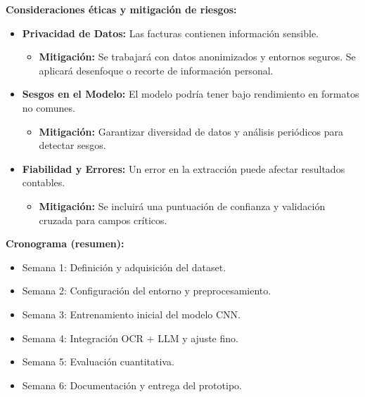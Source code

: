 \documentclass[11pt,letterpaper]{article}
\begin{document}
	\textbf{Consideraciones éticas y mitigación de riesgos:}
	\begin{itemize}
		\item \textbf{Privacidad de Datos:} Las facturas contienen información sensible.
		\begin{itemize}
			\item \textbf{Mitigación:} Se trabajará con datos anonimizados y entornos seguros. Se aplicará desenfoque o recorte de información personal.
		\end{itemize}
		\item \textbf{Sesgos en el Modelo:} El modelo podría tener bajo rendimiento en formatos no comunes.
		\begin{itemize}
			\item \textbf{Mitigación:} Garantizar diversidad de datos y análisis periódicos para detectar sesgos.
		\end{itemize}
		\item \textbf{Fiabilidad y Errores:} Un error en la extracción puede afectar resultados contables.
		\begin{itemize}
			\item \textbf{Mitigación:} Se incluirá una puntuación de confianza y validación cruzada para campos críticos.
		\end{itemize}
	\end{itemize}
	
	\textbf{Cronograma (resumen):}
	\begin{itemize}
		\item Semana 1: Definición y adquisición del dataset.
		\item Semana 2: Configuración del entorno y preprocesamiento.
		\item Semana 3: Entrenamiento inicial del modelo CNN.
		\item Semana 4: Integración OCR + LLM y ajuste fino.
		\item Semana 5: Evaluación cuantitativa.
		\item Semana 6: Documentación y entrega del prototipo.
	\end{itemize}
	
	
	
	
	
\end{document}
